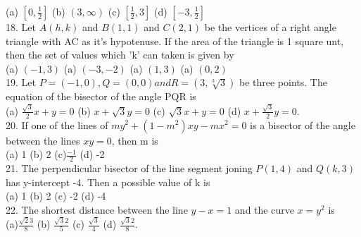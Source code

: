 \documentclass[12pt]{article}
\begin{document}
(a) $\left[ 0,\frac{1}{2}\right] $ \hspace{1cm} (b) $(3,\infty)$ \hspace{1cm} (c) $\left[\frac{1}{2},3\right]$ \hspace{1cm} (d) $\left[-3,\frac{1}{2}\right]$\\
18. Let $A(h,k)$ and $B(1,1)$ and $C(2,1)$ be the vertices of a right angle triangle with AC as it's hypotenuse. If the area of the triangle is 1 square unt, then the set of values which 'k' can taken is given by\\
(a) $(-1,3)$ \hspace{1cm}(a) $(-3,-2)$\hspace{1cm} (a) $(1,3)$ \hspace{1cm}(a) $(0,2)$\\
19. Let $P=(-1,0),Q=(0,0) and R=(3,\sqrt[3]{3})$ be three points. The equation of the bisector of the angle PQR is \\
(a) $\frac{\sqrt{3}}{2}x+y=0$ \hspace{1cm} (b) $x+\sqrt{3}y=0$ \hspace{1cm} (c) $\sqrt{3}x+y=0$ \hspace{1cm}(d) $x+\frac{\sqrt{3}}{2}y=0$.\\
20. If one of the lines of $my^2+(1-m^2)xy-mx^2=0$ is a bisector of the angle between the lines $xy=0$, then m is\\
(a) 1  \hspace{1cm}(b) 2 \hspace{1cm} (c)$\frac{-1}{2}$  \hspace{1cm}(d) -2\\
21. The perpendicular bisector of the line segment joning $P(1,4)$ and $Q(k,3)$ has y-intercept -4. Then a possible value of k is\\
(a) 1 \hspace{1cm}(b) 2 \hspace{1cm}(c) -2 \hspace{1cm}(d) -4\\
22. The shortest distance between the line $y-x=1$ and the curve $x=y^2$ is \\

(a)$\frac{\sqrt{2}{3}}{8}$ \hspace{1cm} (b) $\frac{\sqrt{3}{2}}{5}$ \hspace{1cm} (c) $\frac{\sqrt{3}}{4}$ \hspace{1cm} (d) $\frac{\sqrt{3}{2}}{8}$.\\
\end{document}
